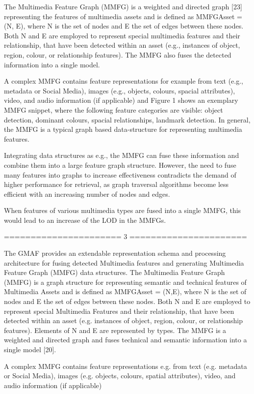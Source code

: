 The Multimedia Feature Graph (MMFG) is a weighted and directed graph [23] representing
the features of multimedia assets and is defined as MMFGAsset = (N, E), where
N is the set of nodes and E the set of edges between these nodes. Both N and E are
employed to represent special multimedia features and their relationship, that have been
detected within an asset (e.g., instances of object, region, colour, or relationship features).
The MMFG also fuses the detected information into a single model.

A complex MMFG contains feature representations for example from text (e.g., metadata
or Social Media), images (e.g., objects, colours, spacial attributes), video, and audio
information (if applicable) and Figure 1 shows an exemplary MMFG snippet, where the
following feature categories are visible: object detection, dominant colours, spacial relationships,
landmark detection. In general, the MMFG is a typical graph based data-structure for
representing multimedia features.

Integrating
data structures as e.g., the MMFG can fuse these information and combine them into a
large feature graph structure. However, the need to fuse many features into graphs to
increase effectiveness contradicts the demand of higher performance for retrieval, as graph
traversal algorithms become less efficient with an increasing number of nodes and edges.

When features of various
multimedia types are fused into a single MMFG, this would lead to an increase of the
LOD in the MMFGs.

====================== 3
======================

The GMAF provides an extendable
representation schema and processing architecture for fusing
detected Multimedia features and generating Multimedia
Feature Graph (MMFG) data structures. The Multimedia
Feature Graph (MMFG) is a graph structure for representing
semantic and technical features of Multimedia Assets and is
defined as MMFGAsset = (N,E), where N is the set of
nodes and E the set of edges between these nodes. Both N
and E are employed to represent special Multimedia Features
and their relationship, that have been detected within an
asset (e.g. instances of object, region, colour, or relationship
features). Elements of N and E are represented by types.
The MMFG is a weighted and directed graph and fuses
technical and semantic information into a single model [20].

A complex
MMFG contains feature representations e.g. from text (e.g.
metadata or Social Media), images (e.g. objects, colours,
spatial attributes), video, and audio information (if applicable)

